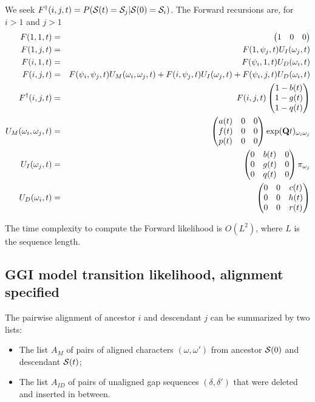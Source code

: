 \documentclass{article}
\begin{document}
We seek $F^\dagger(i,j,t) = P({\cal S}(t)={\cal S}_j|{\cal S}(0)={\cal S}_i)$.
The Forward recursions are, for $i>1$ and $j>1$
\begin{eqnarray*}
F(1,1,t) & = & \begin{pmatrix} 1 & 0 & 0 \end{pmatrix}
\\
F(1,j,t) & = &
F(1,\psi_j,t) U_I(\omega_j,t)
\\
F(i,1,t) & = &
F(\psi_i,1,t) U_D(\omega_i,t)
\\
F(i,j,t) & = &
F(\psi_i,\psi_j,t) U_M(\omega_i,\omega_j,t)
+ F(i,\psi_j,t) U_I(\omega_j,t)
+ F(\psi_i,j,t) U_D(\omega_i,t)
\\
F^\dagger(i,j,t) & = & F(i,j,t) \begin{pmatrix}
1-b(t) \\
1-g(t) \\
1-q(t) \end{pmatrix}
\\
U_M(\omega_i,\omega_j,t) & = &
\begin{pmatrix}
a(t) & 0 & 0 \\
f(t) & 0 & 0 \\
p(t) & 0 & 0 
\end{pmatrix}
\exp({\bf Q}t)_{\omega_i \omega_j}
\\
U_I(\omega_j,t) & = &
\begin{pmatrix}
0 & b(t) & 0 \\
0 & g(t) & 0 \\
0 & q(t) & 0 
\end{pmatrix}
\pi_{\omega_j}
\\
U_D(\omega_i,t) & = &
\begin{pmatrix}
0 & 0 & c(t) \\
0 & 0 & h(t) \\
0 & 0 & r(t) 
\end{pmatrix}
\end{eqnarray*}

The time complexity to compute the Forward likelihood is $O(L^2)$,
where $L$ is the sequence length.

\subsection{GGI model transition likelihood, alignment specified}

The pairwise alignment of ancestor $i$ and descendant $j$ can be summarized by two lists:
\begin{itemize}
    \item The list $A_M$ of pairs of aligned characters $(\omega,\omega')$ from ancestor ${\cal S}(0)$ and descendant ${\cal S}(t)$;
    \item The list $A_{ID}$ of pairs of unaligned gap sequences $(\delta,\delta')$ that were deleted and inserted in between.
\end{itemize}
\end{document}

